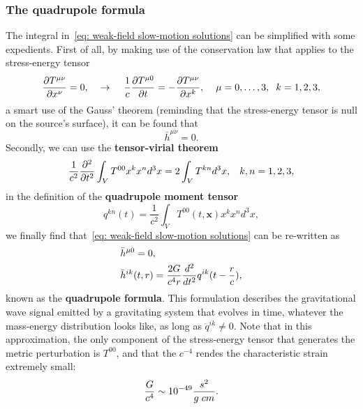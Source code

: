 \subsubsection{The quadrupole formula}
The integral in~\eqref{eq: weak-field slow-motion solutions} can be simplified with some expedients. 
First of all, by making use of the conservation law that applies to the stress-energy tensor
\[
    \frac{\partial T^{\mu\nu}}{\partial x^\nu}=0, \hspace{4mm} \to \hspace{4mm} \frac{1}{c}\frac{\partial T^{\mu 0}}{\partial t} = - \frac{\partial T^{\mu\nu}}{\partial x^k}, \hspace{4mm} \mu=0,\dots,3,\hspace{2mm} k=1,2,3,
\]
a smart use of the Gauss' theorem (reminding that the stress-energy tensor is null on the source's surface), it can be found that 
\[
    \bar{h}^{\mu\nu}=0.
\]
Secondly, we can use the \textbf{tensor-virial theorem}
\begin{equation}
    \frac{1}{c^2}\frac{\partial^2}{\partial t^2}\int_V T^{00}x^kx^nd^3x = 2\int_V T^{kn}d^3x, \hspace{3mm} k,n=1,2,3,
    \label{eq: tensor-virial theorem}
\end{equation}
in the definition of the \textbf{quadrupole moment tensor}
\begin{equation}
    q^{kn}(t) = \frac{1}{c^2}\int_VT^{00}(t,\mathbf{x})x^kx^nd^3x,
    \label{eq: quadrupole moment tensor}
\end{equation}
we finally find that~\eqref{eq: weak-field slow-motion solutions} can be re-written as
\begin{align}
   &\bar{h}^{\mu 0} =0,\notag\\
   &\bar{h}^{ik}(t,r) = \frac{2G}{c^4r}\frac{d^2}{dt^2}q^{ik}(t-\frac{r}{c}),
    \label{eq: quadrupole formula}
\end{align}
known as the \textbf{quadrupole formula}.
This formulation describes the gravitational wave signal emitted by a gravitating system that evolves in time, whatever the mass-energy distribution looks like, as long as $\ddot{q}^{ik}\not = 0$.
Note that in this approximation, the only component of the stress-energy tensor that generates the metric perturbation is $T^{00}$, and that the $c^{-4}$ rendes the characteristic strain extremely small:
\[
    \frac{G}{c^4}\sim 10^{-49}\frac{s^2}{g\hspace{1mm}cm}.
\]

